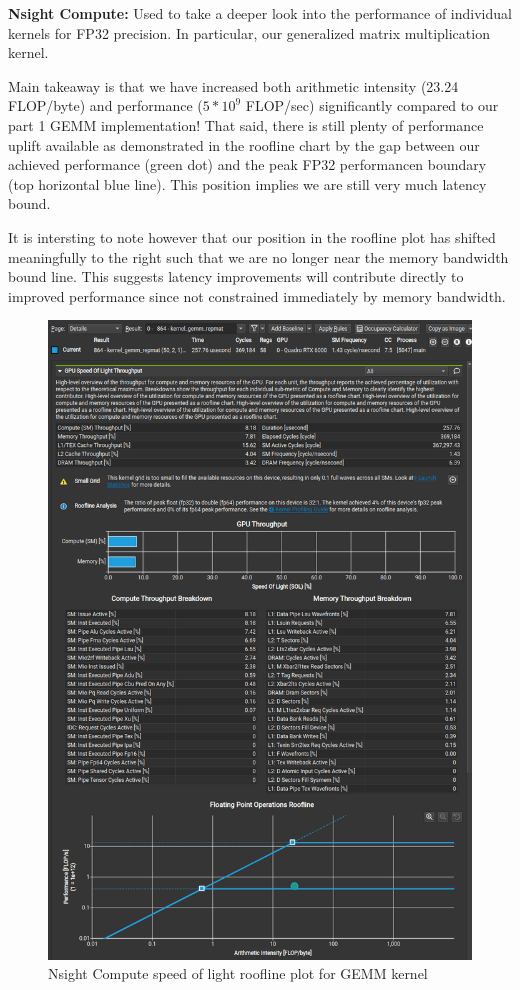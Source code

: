 \documentclass[12pt,letterpaper,twoside]{article}
\begin{document}
\textbf{Nsight Compute:} Used to take a deeper look into the performance of
individual kernels for FP32 precision. In particular, our generalized matrix multiplication kernel.

Main takeaway is that we have increased both arithmetic intensity (23.24 FLOP/byte) and performance
($5*10^{9}$ FLOP/sec) significantly compared to our part 1 GEMM implementation! That said, there is still
plenty of performance uplift available as demonstrated in the roofline chart by the gap between
our achieved performance (green dot) and the peak FP32 performancen boundary (top horizontal
blue line). This position implies we are still very much latency bound.

It is intersting to note however that our position in the roofline plot has shifted meaningfully to
the right such that we are no longer near the memory bandwidth bound line. This suggests latency
improvements will contribute directly to improved performance since not constrained immediately
by memory bandwidth.

\begin{figure}[!htbp]
    \centering
    \includegraphics[scale=0.5]{nsight_compute_roofline2.png}
    \caption{Nsight Compute speed of light roofline plot for GEMM kernel}
\end{figure}
\end{document}
